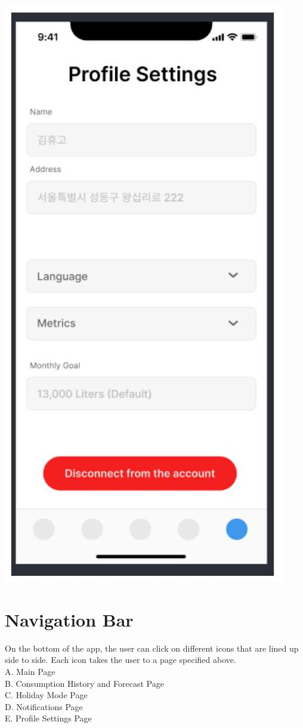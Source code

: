 \documentclass[10pt]{article}
\begin{document}
\includegraphics[max width=\textwidth]{2022_11_16_e80008f3d60227bff292g-7(2)}

\section{Navigation Bar}
On the bottom of the app, the user can click on different icons that are lined up side to side. Each icon takes the user to a page specified above.\\
A. Main Page\\
B. Consumption History and Forecast Page\\
C. Holiday Mode Page\\
D. Notifications Page\\
E. Profile Settings Page
\end{document}
